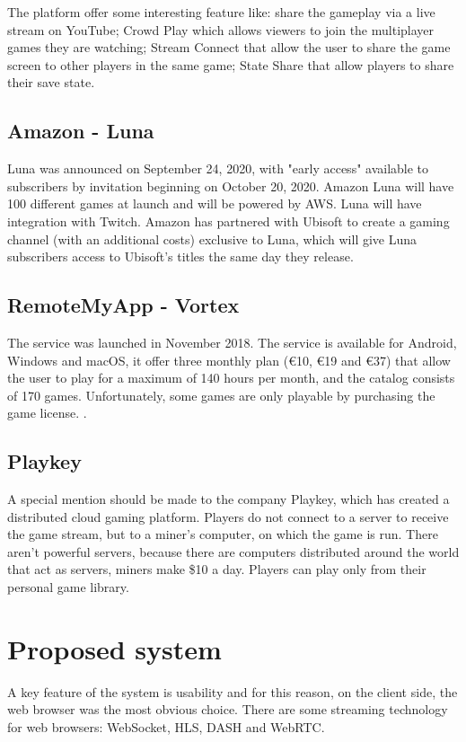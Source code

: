 The platform offer some interesting feature like: share the gameplay via a live stream on YouTube; Crowd Play which allows viewers to join the multiplayer games they are watching; Stream Connect that allow the user to share the game screen to other players in the same game; State Share that allow players to share their save state\cite{Google_Stadia}.

\subsection{Amazon - Luna}
Luna was announced on September 24, 2020, with "early access" available to subscribers by invitation beginning on October 20, 2020. Amazon Luna will have 100 different games at launch and will be powered by AWS. Luna will have integration with Twitch. Amazon has partnered with Ubisoft to create a gaming channel (with an additional costs) exclusive to Luna, which will give Luna subscribers access to Ubisoft's titles the same day they release\cite{Amazon_Luna}.

\subsection{RemoteMyApp - Vortex}
The service was launched in November 2018. The service is available for Android, Windows and macOS, it offer three monthly plan (€10, €19 and €37) that allow the user to play for a maximum of 140 hours per month, and the catalog consists of 170 games. Unfortunately, some games are only playable by purchasing the game license.
\cite{RemoteMyApp_Vortex}.

\subsection{Playkey}
A special mention should be made to the company Playkey, which has created a distributed cloud gaming platform. Players do not connect to a server to receive the game stream, but to a miner's computer, on which the game is run. There aren't powerful servers, because there are computers distributed around the world that act as servers, miners make \$10 a day. Players can play only from their personal game library\cite{Playkey}.

\section{Proposed system}
A key feature of the system is usability and for this reason, on the client side, the web browser was the most obvious choice.
There are some streaming technology for web browsers: WebSocket, HLS, DASH and WebRTC\cite{Audio_and_video_delivery}.

